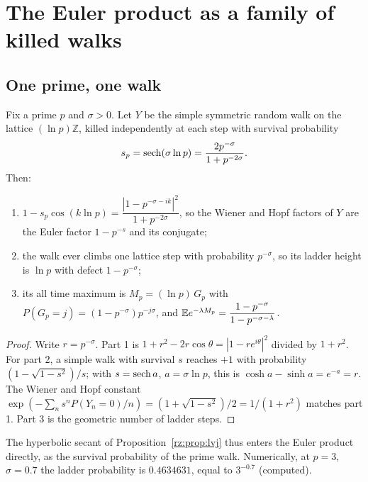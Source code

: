 \section{The Euler product as a family of killed walks}\label{cw:sec:euler}

\subsection{One prime, one walk}
\begin{theorem}[proved]\label{cw:thm:primewalk}
Fix a prime $p$ and $\sigma>0$. Let $Y$ be the simple symmetric random walk on the lattice $(\ln p)\mathbb Z$, killed independently at each step with survival probability
\[
s_p=\operatorname{sech}(\sigma\ln p)=\frac{2p^{-\sigma}}{1+p^{-2\sigma}} .
\]
Then:
\begin{enumerate}
\item $1-s_p\cos(k\ln p)=\dfrac{|1-p^{-\sigma-ik}|^2}{1+p^{-2\sigma}}$, so the Wiener and Hopf factors of $Y$ are the Euler factor $1-p^{-s}$ and its conjugate;
\item the walk ever climbs one lattice step with probability $p^{-\sigma}$, so its ladder height is $\ln p$ with defect $1-p^{-\sigma}$;
\item its all time maximum is $M_p=(\ln p)\,G_p$ with $P(G_p=j)=(1-p^{-\sigma})p^{-j\sigma}$, and $\mathbb{E} e^{-\lambda M_p}=\dfrac{1-p^{-\sigma}}{1-p^{-\sigma-\lambda}}$.
\end{enumerate}
\end{theorem}

\begin{proof}
Write $r=p^{-\sigma}$. Part 1 is $1+r^2-2r\cos\theta=|1-re^{i\theta}|^2$ divided by $1+r^2$. For part 2, a simple walk with survival $s$ reaches $+1$ with probability $(1-\sqrt{1-s^2})/s$; with $s=\operatorname{sech} a$, $a=\sigma\ln p$, this is $\cosh a-\sinh a=e^{-a}=r$. The Wiener and Hopf constant $\exp(-\sum_ns^nP(Y_n=0)/n)=(1+\sqrt{1-s^2})/2=1/(1+r^2)$ matches part 1. Part 3 is the geometric number of ladder steps.
\end{proof}

The hyperbolic secant of Proposition~\ref{rz:prop:lvj} thus enters the Euler product directly, as the survival probability of the prime walk. Numerically, at $p=3$, $\sigma=0.7$ the ladder probability is $0.4634631$, equal to $3^{-0.7}$ (computed).

